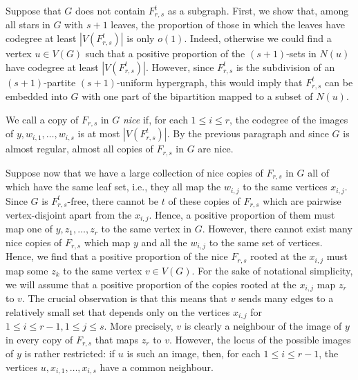\documentclass[11pt]{article}
\numberwithin{equation}{section}
\theoremstyle{definition}
\begin{document}
Suppose that $G$ does not contain $F_{r,s}^t$ as a subgraph. First, we show that, among all stars in $G$ with $s+1$ leaves, the proportion of those in which the leaves have codegree at least $|V(F_{r,s}^t)|$ is only $o(1)$. Indeed, otherwise we could find a vertex $u\in V(G)$ such that a positive proportion of the $(s+1)$-sets  in $N(u)$ have codegree at least $|V(F_{r,s}^t)|$. However, since $F_{r,s}^t$ is the subdivision of an $(s+1)$-partite $(s+1)$-uniform hypergraph, this would imply that $F_{r,s}^t$ can be embedded into $G$ with one part of the bipartition mapped to a subset of $N(u)$.

We call a copy of $F_{r,s}$ in $G$ \emph{nice} if, for each $1\leq i\leq r$, the codegree of the images of $y,w_{i,1},\dots,w_{i,s}$ is at most $|V(F_{r,s}^t)|$. By the previous paragraph and since $G$ is almost regular, almost all copies of $F_{r,s}$ in $G$ are nice.

Suppose now that we have a large collection of nice copies of $F_{r,s}$ in $G$ all of which have the same leaf set, i.e., they all map the $w_{i,j}$ to the same vertices $x_{i,j}$. Since $G$ is $F_{r,s}^t$-free, there cannot be $t$ of these copies of $F_{r,s}$ which are pairwise vertex-disjoint apart from the $x_{i,j}$. Hence, a positive proportion of them must map one of $y,z_1,\dots,z_r$ to the same vertex in $G$. However, there cannot exist many nice copies of $F_{r,s}$ which map $y$ and all the $w_{i,j}$ to the same set of vertices. Hence, we find that a positive proportion of the nice $F_{r,s}$ rooted at the $x_{i,j}$ must map some $z_k$ to the same vertex $v\in V(G)$. For the sake of notational simplicity, we will assume that a positive proportion of the copies rooted at the $x_{i,j}$ map $z_r$ to $v$. The crucial observation is that this means that $v$ sends many edges to a relatively small set that depends only on the vertices $x_{i,j}$ for $1\leq i\leq r-1,1\leq j\leq s$. More precisely, $v$ is clearly a neighbour of the image of $y$ in every copy of $F_{r,s}$ that maps $z_r$ to $v$. However, the locus of the possible images of $y$ is rather restricted: if $u$ is such an image, then, for each $1\leq i\leq r-1$, the vertices $u,x_{i,1},\dots,x_{i,s}$ have a common neighbour.
\end{document}
